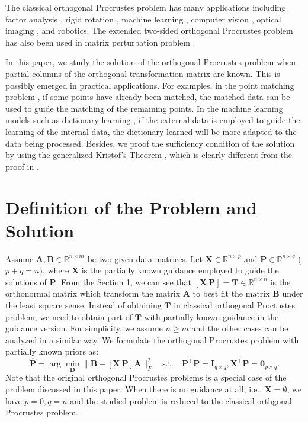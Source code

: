 \documentclass[titlepage,11pt,twoside]{article}
\let\oldemptyset\emptyset
\let\emptyset\varnothing
\begin{document}
The classical orthogonal Procrustes problem \cite{procrustesprogram} has many applications including factor analysis \cite{green1952orthogonal}, rigid rotation \cite{Berge2006}, machine learning \cite{zou2006sparse}, computer vision \cite{zhang2000flexible,pointpatterns}, optical imaging , and robotics. The extended two-sided orthogonal Procrustes problem has also been used in matrix perturbation problem \cite{schonemann1968two}. 

In this paper, we study the solution of the orthogonal Procrustes problem when partial columns of the orthogonal transformation matrix are known. This is possibly emerged in practical applications. For examples, in the point matching problem \cite{pointpatterns}, if some points have already been matched, the matched data can be used to guide the matching of the remaining points. In the machine learning models such as dictionary learning \cite{aharon2006img}, if the external data is employed to guide the learning of the internal data, the dictionary learned will be more adapted to the data being processed. Besides, we proof the sufficiency condition of the solution by using the generalized Kristof's Theorem \cite{TenBerge1983}, which is clearly different from the proof in \cite{schonemann1966generalized}.

\section{Definition of the Problem and Solution}
Assume $\mathbf{A},\mathbf{B}\in \mathbb{R}^{n\times m}$ be two given data matrices. Let $\mathbf{X}\in\mathbb{R}^{n\times p}$ and $\mathbf{P}\in\mathbb{R}^{n\times q}$ ($p+q=n$), where $\mathbf{X}$ is the partially known guidance employed to guide the solutions of $\mathbf{P}$. From the Section 1, we can see that $[\mathbf{X}\ \mathbf{P}]=\mathbf{T}\in\mathbb{R}^{n\times n}$ is the orthonormal matrix which transform the matrix $\mathbf{A}$ to best fit the matrix $\mathbf{B}$ under the least square sense. Instead of obtaining $\mathbf{T}$ in classical orthogonal Proctustes problem, we need to obtain part of $\mathbf{T}$ with partially known guidance in the guidance version. For simplicity, we assume $n\ge m$ and the other cases can be analyzed in a similar way. We formulate the orthogonal Procrustes problem with partially known priors as:
\begin{equation}
\mathbf{\hat{P}}=\arg\min_{\mathbf{D}}\|\mathbf{B}-[\mathbf{X}\ \mathbf{P}]\mathbf{A}\|_{F}^{2}
\quad
\text{s.t.}
\quad
\mathbf{P}^{\top}\mathbf{P} = \mathbf{I}_{q\times q}, \mathbf{X}^{\top}\mathbf{P} = \mathbf{0}_{p\times q}.
\end{equation} 
Note that the original orthogonal Procrustes problems is a special case of the problem discussed in this paper. When there is no guidance at all, i.e., $\mathbf{X}=\oldemptyset$, we have $p=0,q=n$ and the studied problem is reduced to the classical orthgonal Procrustes problem.
\end{document}
